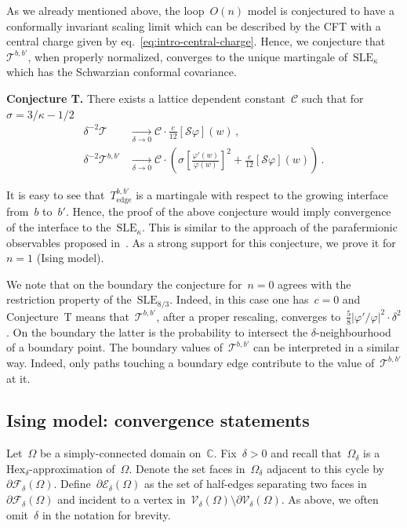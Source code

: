 \documentclass[reqno,11pt,a4paper]{amsart}
\theoremstyle{remark}
\newcommand{\bbC}{\mathbb{C}}
\newcommand{\Vertices}{\mathcal{V}}
\newcommand{\Edges}{\mathcal{E}}
\newcommand{\Faces}{\mathcal{F}}
\newcommand{\sle}{\mathrm{SLE}}
\newcommand{\schw}{\mathcal{S}}
\newcommand{\Hex}{\mathrm{Hex}}
\newcommand{\Te}{T_{\mathrm{edge}}}       \newcommand{\Ce}{c_{\mathrm{edge}}}
\newcommand{\Tgeom}{\mathcal{T}}
\newcommand{\dob}{{b,b'}}
\begin{document}
As we already mentioned above, the loop~$O(n)$ model is conjectured to have a conformally invariant scaling limit which can be described by the CFT with a central charge given by eq.~\eqref{eq:intro-central-charge}.
Hence, we conjecture that~$\Tgeom^\dob$, when properly normalized, converges to the unique martingale of~$\sle_\kappa$ which has the Schwarzian conformal covariance.

{\bf Conjecture T.} There exists a lattice dependent constant~$\mathcal{C}$ such that for~$\sigma = 3/\kappa - 1/2$
\begin{align*}
\delta^{-2}\Tgeom &\xrightarrow[\delta\to 0]{} \mathcal{C}\cdot\frac{c}{12}[\schw\varphi](w)\,,\\
\delta^{-2}\Tgeom^{b,b'} &\xrightarrow[\delta\to 0]{} \mathcal{C}\cdot\left(\sigma\left[\frac{\varphi'(w)}{\varphi(w)}\right]^{2}+\frac{c}{12}[\schw\varphi](w)\right)\,.
\end{align*}

It is easy to see that~$\Te^{b,b'}$ is a martingale with respect to the growing interface from~$b$ to~$b'$.
Hence, the proof of the above conjecture would imply convergence of the interface to the~$\sle_\kappa$.
This is similar to the approach of the parafermionic observables proposed in~\cite{Smi06}.
As a strong support for this conjecture, we prove it for~$n=1$ (Ising model).

We note that on the boundary the conjecture for~$n=0$ agrees with the restriction property of the~$\sle_{8/3}$.
Indeed, in this case one has~$c=0$ and Conjecture~T means that~$\Tgeom^{b,b'}$, after a proper rescaling,
converges to~$\frac{5}{8}|\varphi'/\varphi|^2\cdot\delta^{2}$.
On the boundary the latter is the probability to intersect the $\delta$-neighbourhood of a boundary point.
The boundary values of~$\Tgeom^{b,b'}$ can be interpreted in a similar way.
Indeed, only paths touching a boundary edge contribute to the value of~$\Tgeom^{b,b'}$ at it.


\subsection{Ising model: convergence statements}

Let~$\Omega$ be a simply-connected domain on~$\bbC$.
Fix~$\delta>0$ and recall that~$\Omega_\delta$ is a~$\Hex_\delta$-approximation of~$\Omega$.
Denote the set faces in~$\Omega_\delta$ adjacent to this cycle by~$\partial\Faces_\delta(\Omega)$.
Define~$\partial\Edges_\delta(\Omega)$ as the set of half-edges separating two faces in~$\partial\Faces_\delta(\Omega)$ and incident to a vertex in~$\Vertices_\delta(\Omega) \setminus \partial\Vertices_\delta(\Omega)$.
As above, we often omit~$\delta$ in the notation for brevity.
\end{document}
